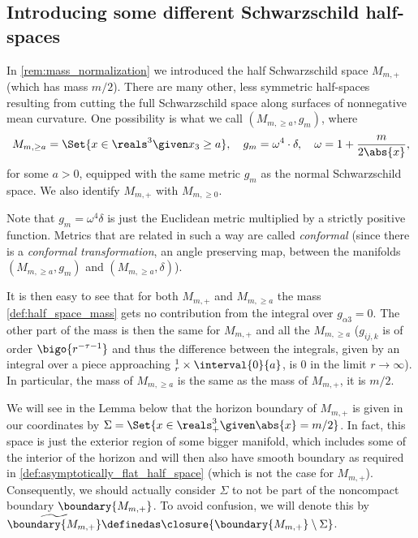 \documentclass[titlepage,numbers=noenddot,oneside,%
cleardoublepage=empty,paper=a4,fontsize=11pt,%
english,%
]{scrartcl}
\let\sphere\relax
\newcommand{\sphere}{\mathbb{S}}
\begin{document}
\subsection{Introducing some different Schwarzschild half-spaces}
In \cref{rem:mass_normalization} we introduced the half Schwarzschild space \( M_{m,+} \) (which has mass \( m/2 \)). There are many other, less symmetric half-spaces resulting from cutting the full Schwarzschild space along surfaces of nonnegative mean curvature. One possibility is what we call \( (M_{m,\geq a},g_m) \), where
\begin{equation*}
    M_{m,\geq a}=\Set{x\in \reals^3\given x_3\geq a},\quad g_m=\omega^4\cdot \delta,\quad \omega=1+\frac{m}{2\abs{x}},
\end{equation*}
for some \( a>0 \), equipped with the same metric \( g_m \) as the normal Schwarzschild space. We also identify \( M_{m,+} \) with \( M_{m,\geq 0} \). 


Note that \( g_m=\omega^4 \delta \) is just the Euclidean metric multiplied by a strictly positive function. Metrics that are related in such a way are called \emph{conformal} (since there is a \emph{conformal transformation}, \ie an angle preserving map, between the manifolds \( (M_{m,\geq a},g_m) \) and \( (M_{m,\geq a},\delta) \)).

It is then easy to see that for both \( M_{m,+} \) and \( M_{m,\geq a} \) the mass \cref{def:half_space_mass} gets no contribution from the integral over \( g_{\alpha 3}=0 \). The other part of the mass is then the same for \( M_{m,+} \) and all the \( M_{m,\geq a} \) (\( g_{ij,k} \) is of order \( \bigo{r^{-\tau-1}} \) and thus the difference between the integrals, given by an integral over a piece approaching \( \sphere^1_r\times \interval{0}{a} \), is \( 0 \) in the limit \( r\to \infty \)). In particular, the mass of \( M_{m,\geq a} \) is the same as the mass of \( M_{m,+} \), \ie it is \( m/2 \).


\newcommand{\schwarzschildboundary}{\widetilde{\boundary{M_{m,+}}}}
\newcommand{\modifiedschwarzschildboundary}{\boundary{M_{m,\geq a}}}


We will see in the Lemma below that the horizon boundary of \( M_{m,+} \) is given in our coordinates by \( \Sigma=\Set{x\in \reals^3_+\given \abs{x}=m/2} \). In fact, this space is just the exterior region of some bigger manifold, which includes some of the interior of the horizon and will then also have smooth boundary as required in \cref{def:asymptotically_flat_half_space} (which is not the case for \( M_{m,+} \)). Consequently, we should actually consider \( \Sigma \) to not be part of the noncompact boundary \( \boundary{M_{m,+}} \). To avoid confusion, we will denote this by \( \schwarzschildboundary\definedas \closure{\boundary{M_{m,+}}\setminus \Sigma} \).
\end{document}
